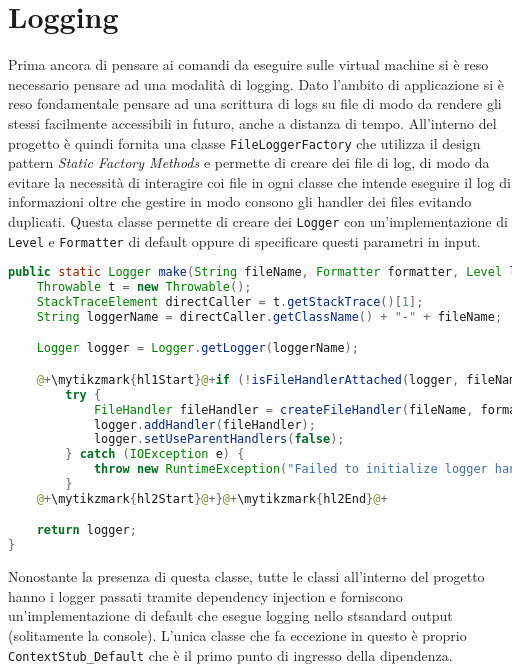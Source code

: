 \section{Logging}
Prima ancora di pensare ai comandi da eseguire sulle virtual machine si è reso necessario pensare ad una modalità di logging. Dato l'ambito di applicazione si è reso fondamentale pensare ad una scrittura di logs su file di modo da rendere gli stessi facilmente accessibili in futuro, anche a distanza di tempo.\medbreak
All'interno del progetto è quindi fornita una classe \texttt{FileLoggerFactory} che utilizza il design pattern \emph{Static Factory Methods} \cite{effectiveJava} e permette di creare dei file di log, di modo da evitare la necessità di interagire coi file in ogni classe che intende eseguire il log di informazioni oltre che gestire in modo consono gli handler dei files evitando duplicati. Questa classe permette di creare dei \texttt{Logger} con un'implementazione di \texttt{Level} e \texttt{Formatter} di default oppure di specificare questi parametri in input.
\begin{lstlisting}[language=Java, caption=Metodo make di FileLoggerFactory, float, label=code:FileLoggerFactoryMake]
public static Logger make(String fileName, Formatter formatter, Level level) {
    Throwable t = new Throwable();
    StackTraceElement directCaller = t.getStackTrace()[1];
    String loggerName = directCaller.getClassName() + "-" + fileName;

    Logger logger = Logger.getLogger(loggerName);

    @+\mytikzmark{hl1Start}@+if (!isFileHandlerAttached(logger, fileName)) {@+\mytikzmark{hl1End}@+
        try {
            FileHandler fileHandler = createFileHandler(fileName, formatter, level);
            logger.addHandler(fileHandler);
            logger.setUseParentHandlers(false);
        } catch (IOException e) {
            throw new RuntimeException("Failed to initialize logger handler.", e);
        }
    @+\mytikzmark{hl2Start}@+}@+\mytikzmark{hl2End}@+

    return logger;
}
    \end{lstlisting}
Nonostante la presenza di questa classe, tutte le classi all'interno del progetto hanno i logger passati tramite dependency injection e forniscono un'implementazione di default che esegue logging nello stsandard output (solitamente la console). L'unica classe che fa eccezione in questo è proprio \texttt{ContextStub\_Default} che è il primo punto di ingresso della dipendenza.\\
